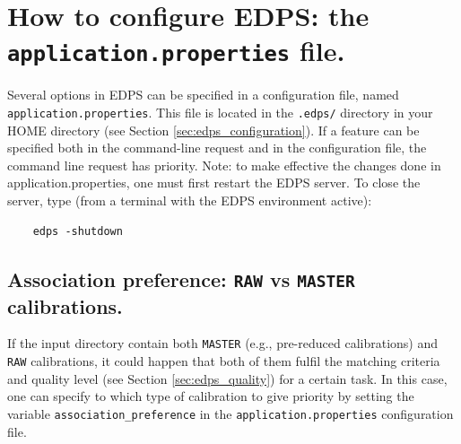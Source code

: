 
\section{How to configure EDPS: the {\tt application.properties} file.}
\label{sec:edps_application_properties}
Several options in EDPS can be specified in a configuration file, named {\tt application.properties}. This file is located in the {\tt .edps/} directory in your HOME directory (see Section \ref{sec:edps_configuration}). 
If a feature can be specified both in the command-line request and in the configuration file, the command line request has priority.
Note: to make effective the changes done in application.properties, one must first restart the EDPS server. To close the server, type (from a terminal with the EDPS environment active):
\begin{verbatim}
    edps -shutdown
\end{verbatim}

\subsection{Association preference: {\tt RAW} vs {\tt MASTER} calibrations.}
\label{sec:edps_association_preference}

If the input directory contain both {\tt MASTER} (e.g., pre-reduced calibrations) and {\tt RAW} calibrations, it could happen that both of them fulfil the matching criteria and quality level (see Section \ref{sec:edps_quality}) for a certain task. In this case, one can specify to which type of calibration to give priority by setting the variable {\tt association\_preference} in the {\tt application.properties} configuration file. 

